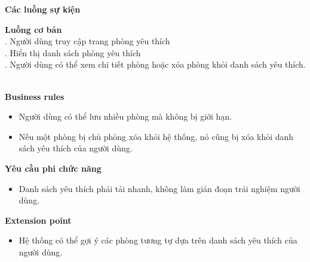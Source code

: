 \textbf{Các luồng sự kiện}

\begin{small}
\textbf{Luồng cơ bản}\\
. Người dùng truy cập trang phòng yêu thích\\
. Hiển thị danh sách phòng yêu thích\\
. Người dùng có thể xem chi tiết phòng hoặc xóa phòng khỏi danh sách yêu thích.\\
\end{small}\\
\textbf{\indent Business rules}
\begin{itemize}
    \item Người dùng có thể lưu nhiều phòng mà không bị giới hạn.
    \item Nếu một phòng bị chủ phòng xóa khỏi hệ thống, nó cũng bị xóa khỏi danh sách yêu thích của người dùng.
\end{itemize}

\textbf{Yêu cầu phi chức năng}
\begin{itemize}
    \item Danh sách yêu thích phải tải nhanh, không làm gián đoạn trải nghiệm người dùng.
\end{itemize}

\textbf{Extension point}
\begin{itemize}
    \item Hệ thống có thể gợi ý các phòng tương tự dựa trên danh sách yêu thích của người dùng.
\end{itemize}



